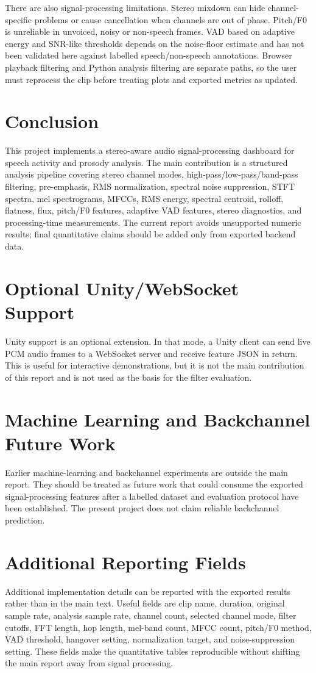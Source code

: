 ﻿\documentclass[11pt,a4paper]{article}
\begin{document}
There are also signal-processing limitations. Stereo mixdown can hide channel-specific problems or cause cancellation when channels are out of phase. Pitch/F0 is unreliable in unvoiced, noisy or non-speech frames. VAD based on adaptive energy and SNR-like thresholds depends on the noise-floor estimate and has not been validated here against labelled speech/non-speech annotations. Browser playback filtering and Python analysis filtering are separate paths, so the user must reprocess the clip before treating plots and exported metrics as updated.

\section{Conclusion}
This project implements a stereo-aware audio signal-processing dashboard for speech activity and prosody analysis. The main contribution is a structured analysis pipeline covering stereo channel modes, high-pass/low-pass/band-pass filtering, pre-emphasis, RMS normalization, spectral noise suppression, STFT spectra, mel spectrograms, MFCCs, RMS energy, spectral centroid, rolloff, flatness, flux, pitch/F0 features, adaptive VAD features, stereo diagnostics, and processing-time measurements. The current report avoids unsupported numeric results; final quantitative claims should be added only from exported backend data.

\appendix
\section{Optional Unity/WebSocket Support}
Unity support is an optional extension. In that mode, a Unity client can send live PCM audio frames to a WebSocket server and receive feature JSON in return. This is useful for interactive demonstrations, but it is not the main contribution of this report and is not used as the basis for the filter evaluation.

\section{Machine Learning and Backchannel Future Work}
Earlier machine-learning and backchannel experiments are outside the main report. They should be treated as future work that could consume the exported signal-processing features after a labelled dataset and evaluation protocol have been established. The present project does not claim reliable backchannel prediction.

\section{Additional Reporting Fields}
Additional implementation details can be reported with the exported results rather than in the main text. Useful fields are clip name, duration, original sample rate, analysis sample rate, channel count, selected channel mode, filter cutoffs, FFT length, hop length, mel-band count, MFCC count, pitch/F0 method, VAD threshold, hangover setting, normalization target, and noise-suppression setting. These fields make the quantitative tables reproducible without shifting the main report away from signal processing.



\end{document}
